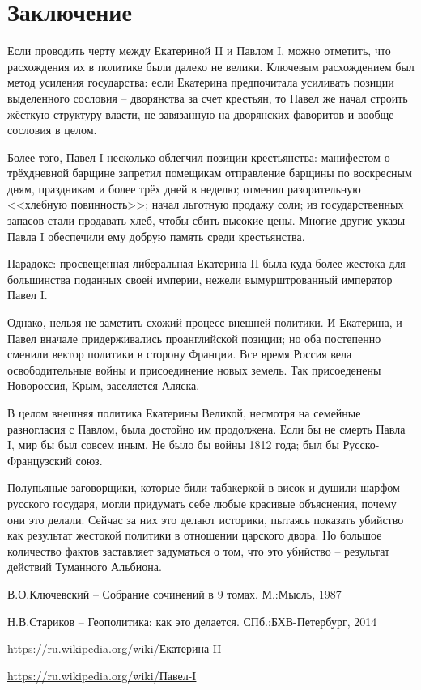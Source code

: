 \documentclass[a4paper,12pt]{diss_4}
\begin{document}
\chapter*{Заключение}

Если проводить черту между Екатериной II и Павлом I, можно отметить, что расхождения их в политике были далеко не велики. Ключевым расхождением был метод усиления государства: если Екатерина предпочитала усиливать позиции выделенного сословия -- дворянства за счет крестьян, то Павел же начал строить жёсткую структуру власти, не завязанную на дворянских фаворитов и вообще сословия в целом. 

Более того, Павел I несколько облегчил позиции крестьянства: манифестом о трёхдневной барщине запретил помещикам отправление барщины по воскресным дням, праздникам и более трёх дней в неделю; отменил разорительную <<хлебную повинность>>; начал льготную продажу соли; из государственных запасов стали продавать хлеб, чтобы сбить высокие цены. Многие другие указы Павла I обеспечили ему добрую память среди крестьянства.

Парадокс: просвещенная либеральная Екатерина II была куда более жестока для большинства поданных своей империи, нежели вымурштрованный император Павел I.

Однако, нельзя не заметить схожий процесс внешней политики. И Екатерина, и Павел вначале придерживались проанглийской позиции; но оба постепенно сменили вектор политики в сторону Франции. Все время Россия вела освободительные войны и присоединение новых земель. Так присоеденены Новороссия, Крым, заселяется Аляска. 

В целом внешняя политика Екатерины Великой, несмотря на семейные разногласия с Павлом, была достойно им продолжена. Если бы не смерть Павла I, мир бы был совсем иным. Не было бы войны 1812 года; был бы Русско-Французский союз.

Полупьяные заговорщики, которые били табакеркой в висок и душили шарфом русского государя, могли придумать себе любые красивые объяснения, почему они это делали. Сейчас за них это делают историки, пытаясь показать убийство как результат жестокой политики в отношении царского двора. Но большое количество фактов заставляет задуматься о том, что это убийство -- результат действий Туманного Альбиона. 


\begin{thebibliography}{99}

 В.О.Ключевский -- Собрание сочинений в 9 томах. М.:Мысль, 1987

 Н.В.Стариков -- Геополитика: как это делается. СПб.:БХВ-Петербург, 2014

 \href{https://ru.wikipedia.org/wiki/%D0%95%D0%BA%D0%B0%D1%82%D0%B5%D1%80%D0%B8%D0%BD%D0%B0_II}{https://ru.wikipedia.org/wiki/Екатерина-II}

 \href{https://ru.wikipedia.org/wiki/%CF%E0%E2%E5%EB_I}{https://ru.wikipedia.org/wiki/Павел-I}

\end{thebibliography}
\end{document}
